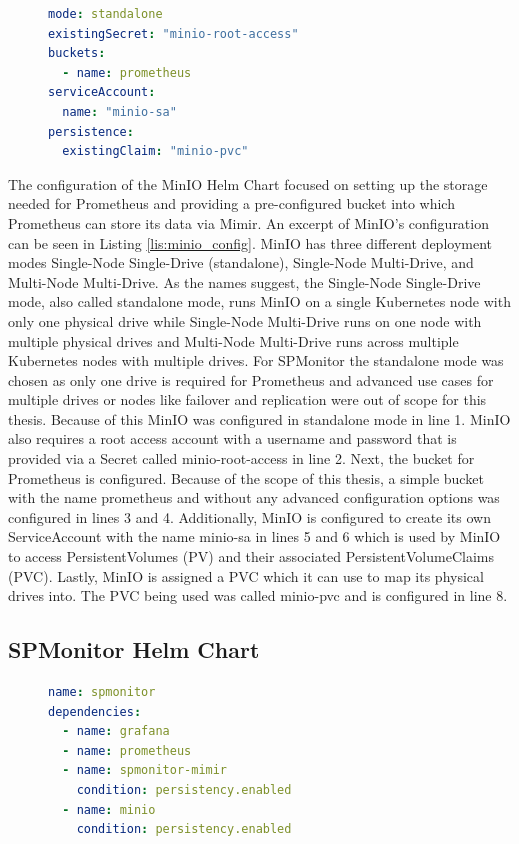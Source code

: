 \begin{figure}[tb]
\begin{lstlisting}[caption = {MinIO Helm Chart Configuration}, label = {lis:minio_config}, style = kit-cm, language=yaml]
mode: standalone
existingSecret: "minio-root-access"
buckets:
  - name: prometheus
serviceAccount:
  name: "minio-sa"
persistence:
  existingClaim: "minio-pvc"
\end{lstlisting}
\end{figure}

The configuration of the MinIO Helm Chart \cite{MIN-HELM} focused on setting up
the storage needed for Prometheus and providing a pre-configured bucket into which Prometheus
can store its data via Mimir. An excerpt of MinIO's configuration can be seen in Listing \ref{lis:minio_config}.
MinIO has three different deployment modes Single-Node Single-Drive (standalone),
Single-Node Multi-Drive, and Multi-Node Multi-Drive. As the names suggest,
the Single-Node Single-Drive mode, also called standalone mode, runs MinIO on a single Kubernetes node with only one physical
drive while Single-Node Multi-Drive runs on one node with multiple physical drives and
Multi-Node Multi-Drive runs across multiple Kubernetes nodes with multiple drives.
For SPMonitor the standalone mode was chosen as only one drive is required for Prometheus
and advanced use cases for multiple drives or nodes like failover and replication were out of scope
for this thesis. Because of this MinIO was configured in standalone mode in line 1.
MinIO also requires a root access account with a username and password that is provided via a Secret called
minio-root-access in line 2. Next, the bucket for Prometheus is configured. Because of the scope of this thesis,
a simple bucket with the name prometheus and without any advanced configuration options was configured in lines 3 and 4.
Additionally, MinIO is configured to create its own ServiceAccount with the name minio-sa in lines 5 and 6 which is used
by MinIO to access PersistentVolumes (PV) and their associated PersistentVolumeClaims (PVC).
Lastly, MinIO is assigned a PVC which it can use to map its physical drives into. The PVC being used
was called minio-pvc and is configured in line 8.

\subsection*{SPMonitor Helm Chart}

\begin{figure}[tb]
\begin{lstlisting}[caption = {SPMonitor Umbrella Helm Chart}, label = {lis:spmonitor_helmchart}, style = kit-cm, language=yaml]
name: spmonitor
dependencies:
  - name: grafana
  - name: prometheus
  - name: spmonitor-mimir
    condition: persistency.enabled
  - name: minio
    condition: persistency.enabled
\end{lstlisting}
\end{figure}

